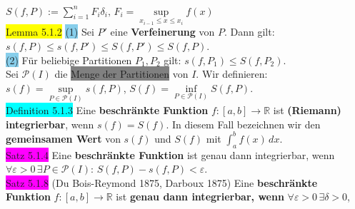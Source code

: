 \documentclass[landscape, 10pt]{article}
\newcommand{\R}{\mathbb{R}}
\begin{document}
\begin{multicols}{3}
                     \textcolor{NavyBlue}{$S(f,P):=\sum_{i=1}^nF_i\delta_i,\, 
                     F_i=\sup\limits_{x_{i-1}\leqslant x\leqslant x_i}f(x)$}\\
              \colorbox{yellow}{Lemma 5.1.2} 
                     \colorbox{SkyBlue}{(1)} Sei \textcolor{NavyBlue}{$P'$}
                     eine \textbf{Verfeinerung} von \textcolor{NavyBlue}{$P$}. Dann gilt: 
                     \textcolor{NavyBlue}{
                     $s(f,P)\leqslant s(f,P')\leqslant S(f,P')\leqslant S(f,P)$}.\\
                     \colorbox{SkyBlue}{(2)} Für beliebige Partitionen 
                     \textcolor{NavyBlue}{$P_1,P_2$}
                     gilt: \textcolor{NavyBlue}{$s(f,P_1)\leqslant S(f,P_2)$}.\\
              Sei \textcolor{NavyBlue}{$\mathcal{P}(I)$} 
                     die \colorbox{gray}{Menge der Partitionen} 
                     von \textcolor{NavyBlue}{$I$}. Wir definieren: 
                     \textcolor{NavyBlue}{
                     $s(f)=\sup\limits_{P\in\mathcal{P}(I)}s(f,P)$},\quad 
                     \textcolor{NavyBlue}{
                     $S(f)=\inf\limits_{P\in\mathcal{P}(I)}S(f,P)$}. \\
              \colorbox{cyan}{Definition 5.1.3} 
                     Eine \textbf{beschränkte Funktion} 
                     \textcolor{NavyBlue}{$f:[a,b]\longrightarrow\R$} 
                     ist \textbf{(Riemann) integrierbar}, wenn \textcolor{NavyBlue}{$s(f)=S(f)$}. 
                     In diesem Fall 
                     bezeichnen wir den \textbf{gemeinsamen Wert} 
                     von \textcolor{NavyBlue}{$s(f)$} und 
                     \textcolor{NavyBlue}{$S(f)$} mit 
                     \textcolor{NavyBlue}{$\int_a^bf(x)\,dx$}.\\
              \colorbox{magenta}{Satz 5.1.4} 
              Eine \textbf{beschränkte Funktion} ist 
                     genau dann integrierbar, wenn 
                     \textcolor{NavyBlue}{
                     $\forall\varepsilon>0\,\exists P\in\mathcal{P}(I)$}:
                     \textcolor{NavyBlue}{$S(f,P)-s(f,P)<\varepsilon$}.\\
              \colorbox{magenta}{Satz 5.1.8} 
              (Du Bois-Reymond 1875, Darboux 1875) 
                     Eine \textbf{beschränkte Funktion} 
                     \textcolor{NavyBlue}{$f:[a,b]\longrightarrow\R$} 
                     ist \textbf{genau dann 
                     integrierbar, wenn} 
                     \textcolor{NavyBlue}{$\forall\varepsilon>0\,\exists\delta>0$}, 

\end{multicols}
\end{document}
